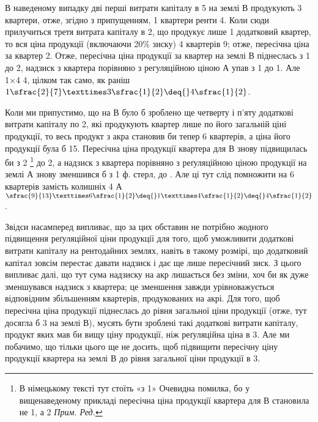 В наведеному випадку дві перші витрати капіталу в 5 на землі $В$
продукують 3 квартери, отже, згідно з припущенням, 1
квартери ренти \deq{} 4. Коли сюди прилучиться третя витрата
капіталу в 2,
що продукує лише 1 додатковий квартер, то вся ціна продукції (включаючи 20\%
зиску) 4 квартерів \deq{} 9; отже, пересічна ціна за
квартер \deq{} 2. Отже, пересічна ціна продукції за квартер на землі $В$
піднеслась з 1
до 2, надзиск з квартера порівняно з регуляційною ціною $А$ упав
з 1 до 1. Але 1×4 \deq{} 4, цілком так само,
як раніш $1\sfrac{2}{7} × 3\sfrac{1}{2} \deq{} 4\sfrac{1}{2}$.

Коли ми припустимо, що на $В$ було б зроблено ще четверту і п’яту додаткові
витрати капіталу по 2, які продукують квартер лише по його
загальній ціні продукції, то весь продукт з акра становив би тепер 6 квартерів,
а ціна його продукції була б 15. Пересічна ціна продукції
квартера для $В$ знову підвищилась би з 2
\footnote*{В німецькому тексті тут стоїть «з 1» Очевидна помилка,
бо у вищенаведеному прикладі пересічна ціна продукції квартера для $В$
становила не 1, а 2 \emph{Прим. Ред.}}
до 2, а надзиск з квартера
порівняно з реґуляційною ціною продукції на землі $А$ знову зменшився
б з 1 ф. стерл, до . Але ці  тут слід
помножити на 6 квартерів замість колишніх 4
$А$ $\sfrac{9}{13}×6\sfrac{1}{2} \deq{} 1× 4\sfrac{1}{2} \deq{} 4\sfrac{1}{2}$.

Звідси насамперед випливає, що за цих обставин не потрібно жодного підвищення
реґуляційної ціни продукції для того, щоб уможливити додаткові витрати
капіталу на рентодайних землях, навіть в такому розмірі, що додатковий
капітал зовсім перестає давати надзиск і дає ще лише пересічний зиск. З
цього випливає далі, що тут сума надзиску на акр лишається без зміни,
хоч би як дуже зменшувався надзиск з квартера; це зменшення завжди урівноважується
відповідним збільшенням квартерів, продукованих на акрі. Для того,
щоб пересічна ціна продукції піднеслась до рівня загальної ціни продукції (отже,
тут досягла б 3 на землі $В$), мусять бути зроблені такі додаткові витрати
капіталу, продукт яких мав би вищу ціну продукції, ніж реґуляційна ціна
в 3. Але ми побачимо, що тільки цього ще не досить, щоб підвищити
пересічну ціну продукції квартера на землі $В$ до рівня загальної ціни продукції
в 3.

